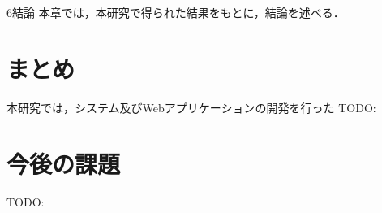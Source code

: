 \chapterhead
{6}{結論}
{本章では，本研究で得られた結果をもとに，結論を述べる．}

\section{まとめ}
本研究では，システム及びWebアプリケーションの開発を行った
TODO:

\newpage

\section{今後の課題}
TODO:

